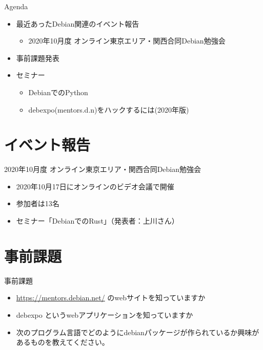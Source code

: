 \begin{frame}{Agenda}
 \begin{minipage}[t]{0.45\hsize}
  \begin{itemize}
  \item 最近あったDebian関連のイベント報告
    \begin{itemize}
    \item 2020年10月度 オンライン東京エリア・関西合同Debian勉強会
    \end{itemize}
  \item 事前課題発表
  \end{itemize}
 \end{minipage}
 \begin{minipage}[t]{0.45\hsize}
   \begin{itemize}
   \item セミナー
     \begin{itemize}
     \item DebianでのPython
     \item debexpo(mentors.d.n)をハックするには(2020年版)
     \end{itemize}
  \end{itemize}
 \end{minipage}
\end{frame}

\section{イベント報告}

\begin{frame}{2020年10月度 オンライン東京エリア・関西合同Debian勉強会}
\begin{itemize}
\item 2020年10月17日にオンラインのビデオ会議で開催
\item 参加者は13名
\item セミナー「DebianでのRust」（発表者：上川さん）
\end{itemize}
\end{frame}


\section{事前課題}


\begin{frame}{事前課題}
  \begin{itemize}
  \item \url{https://mentors.debian.net/} のwebサイトを知っていますか
  \item debexpo というwebアプリケーションを知っていますか
  \item 次のプログラム言語でどのようにdebianパッケージが作られているか興味があるものを教えてください。
  \end{itemize}
\end{frame}

